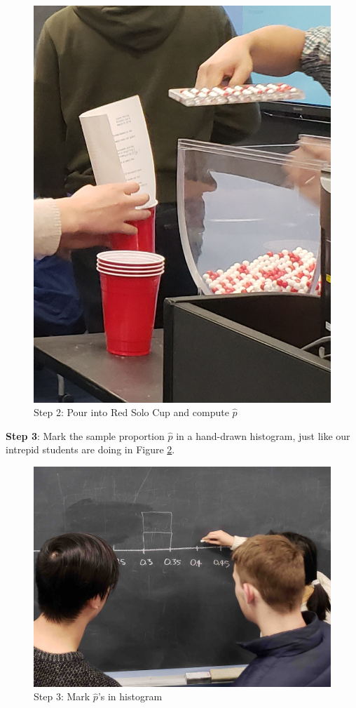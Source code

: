 \documentclass[12pt,]{krantz}
\begin{document}
\begin{figure}

{\centering \includegraphics[width=0.8\linewidth]{images/sampling/tactile_2_a} 

}

\caption{Step 2: Pour into Red Solo Cup and compute $\widehat{p}$}\label{fig:tactile2}
\end{figure}

\textbf{Step 3}: Mark the sample proportion \(\widehat{p}\) in a
hand-drawn histogram, just like our intrepid students are doing in
Figure \ref{fig:tactile3}.

\begin{figure}

{\centering \includegraphics[width=0.8\linewidth]{images/sampling/tactile_3_a} 

}

\caption{Step 3: Mark $\widehat{p}$'s in histogram}\label{fig:tactile3}
\end{figure}
\end{document}
